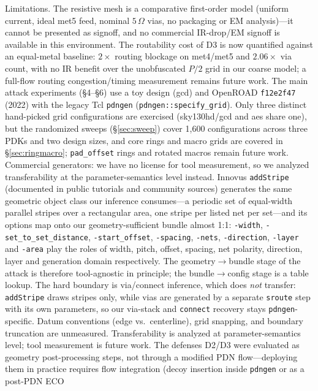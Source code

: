 \documentclass[11pt]{article}
\begin{document}
Limitations.  The resistive mesh is a comparative
first-order model (uniform current, ideal met5 feed, nominal
$5\,\Omega$ vias, no packaging or EM analysis)---it cannot be presented
as signoff, and no commercial IR-drop/EM signoff is available in this
environment.  The routability cost of D3 is now quantified against an equal-metal
baseline: $2\times$ routing blockage on met4/met5 and $2.06\times$ via
count, with no IR benefit over the unobfuscated $P/2$ grid in our coarse
model; a full-flow routing congestion/timing measurement remains future work.  The
main attack experiments (\S4--\S6) use a toy design (gcd) and OpenROAD
\texttt{f12e2f47} (2022) with the legacy Tcl \texttt{pdngen}
(\texttt{pdngen::specify\_grid}).  Only three distinct hand-picked grid
configurations are exercised (sky130hd/gcd and aes share one), but the
randomized sweeps (\S\ref{sec:sweep}) cover 1{,}600 configurations across
three PDKs and two design sizes, and core
rings and macro grids are covered in \S\ref{sec:ringmacro};
\texttt{pad\_offset} rings and rotated macros remain future work.
Commercial generators: we have no license for tool measurement, so we
analyzed transferability at the parameter-semantics level instead.
Innovus \texttt{addStripe} (documented in public tutorials and
community sources) generates the same geometric object class our
inference consumes---a periodic set of equal-width parallel stripes over
a rectangular area, one stripe per listed net per set---and its options
map onto our geometry-sufficient bundle almost 1:1:
\texttt{-width}, \texttt{-set\_to\_set\_distance},
\texttt{-start\_offset}, \texttt{-spacing}, \texttt{-nets},
\texttt{-direction}, \texttt{-layer} and \texttt{-area} play the roles
of width, pitch, offset, spacing, net polarity, direction, layer and
generation domain respectively.  The
geometry$\to$bundle stage of the attack is therefore tool-agnostic in
principle; the bundle$\to$config stage is a table lookup.  The hard
boundary is via/connect inference, which does \emph{not} transfer:
\texttt{addStripe} draws stripes only, while vias are generated by a
separate \texttt{sroute} step with its own parameters, so our via-stack
and \texttt{connect} recovery stays \texttt{pdngen}-specific.  Datum
conventions (edge vs.\ centerline), grid snapping, and boundary
truncation are unmeasured.  Transferability is analyzed at
parameter-semantics level; tool measurement is future work.
The defenses D2/D3 were evaluated as geometry post-processing steps, not
through a modified PDN flow---deploying them in practice requires flow
integration (decoy insertion inside \texttt{pdngen} or as a post-PDN ECO
\end{document}
